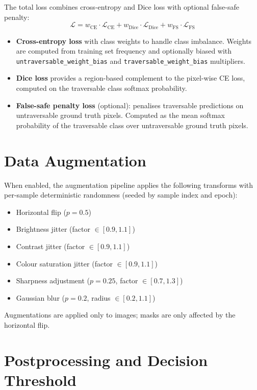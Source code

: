 \documentclass[12pt,a4paper]{report}
\begin{document}
The total loss combines cross-entropy and Dice loss with optional false-safe penalty:
\begin{equation}
\mathcal{L} = w_{\text{CE}} \cdot \mathcal{L}_{\text{CE}} + w_{\text{Dice}} \cdot \mathcal{L}_{\text{Dice}} + w_{\text{FS}} \cdot \mathcal{L}_{\text{FS}}
\label{eq:loss}
\end{equation}
\begin{itemize}[nosep]
  \item \textbf{Cross-entropy loss} with class weights to handle class imbalance.
        Weights are computed from training set frequency and optionally biased with \texttt{untraversable\_weight\_bias} and \texttt{traversable\_weight\_bias} multipliers.
  \item \textbf{Dice loss} provides a region-based complement to the pixel-wise CE loss, computed on the traversable class softmax probability.
  \item \textbf{False-safe penalty loss} (optional): penalises traversable predictions on untraversable ground truth pixels.
        Computed as the mean softmax probability of the traversable class over untraversable ground truth pixels.
\end{itemize}

\section{Data Augmentation}

When enabled, the augmentation pipeline applies the following transforms with per-sample deterministic randomness (seeded by sample index and epoch):
\begin{itemize}[nosep]
  \item Horizontal flip ($p{=}0.5$)
  \item Brightness jitter (factor $\in [0.9, 1.1]$)
  \item Contrast jitter (factor $\in [0.9, 1.1]$)
  \item Colour saturation jitter (factor $\in [0.9, 1.1]$)
  \item Sharpness adjustment ($p{=}0.25$, factor $\in [0.7, 1.3]$)
  \item Gaussian blur ($p{=}0.2$, radius $\in [0.2, 1.1]$)
\end{itemize}
Augmentations are applied only to images; masks are only affected by the horizontal flip.

\section{Postprocessing and Decision Threshold}
\end{document}
